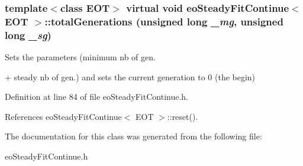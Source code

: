 \subsubsection{\setlength{\rightskip}{0pt plus 5cm}template$<$class EOT$>$ virtual void {\bf eo\-Steady\-Fit\-Continue}$<$ {\bf EOT} $>$::total\-Generations (unsigned long {\em \_\-mg}, unsigned long {\em \_\-sg})\hspace{0.3cm}{\tt  [inline, virtual]}}\label{classeo_steady_fit_continue_a3}


Sets the parameters (minimum nb of gen. 

+ steady nb of gen.) and sets the current generation to 0 (the begin) 

Definition at line 84 of file eo\-Steady\-Fit\-Continue.h.

References eo\-Steady\-Fit\-Continue$<$ EOT $>$::reset().

The documentation for this class was generated from the following file:\begin{CompactItemize}
\item 
eo\-Steady\-Fit\-Continue.h\end{CompactItemize}
